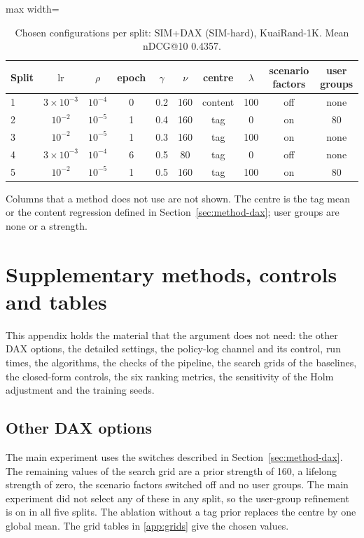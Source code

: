 \documentclass[preprint,12pt,authoryear]{elsarticle}
\begin{document}
\begin{table}[tbp]
\centering
\footnotesize
\caption{Chosen configurations per split: SIM+DAX (SIM-hard), KuaiRand-1K. Mean nDCG@10 0.4357.}
\label{tab:grid17}
\begin{adjustbox}{max width=\linewidth}
\begin{tabular}{lccccccccc}
\toprule
Split & $\mathrm{lr}$ & $\rho$ & epoch & $\gamma$ & $\nu$ & centre & $\lambda$ & scenario factors & user groups \\
\midrule
1 & $3\times10^{-3}$ & $10^{-4}$ & 0 & 0.2 & 160 & content & 100 & off & none \\
2 & $10^{-2}$ & $10^{-5}$ & 1 & 0.4 & 160 & tag & 0 & on & 80 \\
3 & $10^{-2}$ & $10^{-5}$ & 1 & 0.3 & 160 & tag & 100 & on & none \\
4 & $3\times10^{-3}$ & $10^{-4}$ & 6 & 0.5 & 80 & tag & 0 & off & none \\
5 & $10^{-2}$ & $10^{-5}$ & 1 & 0.5 & 160 & tag & 100 & on & 80 \\
\bottomrule
\end{tabular}
\end{adjustbox}
\par\smallskip
\begin{minipage}{\linewidth}\raggedright\footnotesize Columns that a method does not use are not shown. The centre is the tag mean or the content regression defined in Section~\ref{sec:method-dax}; user groups are none or a strength.\end{minipage}
\end{table}

\section{Supplementary methods, controls and tables}
\label{app:supp}

This appendix holds the material that the argument does not need: the other DAX options, the detailed settings, the policy-log channel and its
control, run times, the algorithms, the checks of the pipeline, the search grids of the baselines, the closed-form controls, the six ranking metrics, the sensitivity of the
Holm adjustment and the training seeds.

\subsection{Other DAX options}\label{app:fh}

The main experiment uses the switches described in Section~\ref{sec:method-dax}. The remaining values of the search grid are a prior strength of 160, a
lifelong strength of zero, the scenario factors switched off and no user groups. The main experiment did not select any of these in any split, so the user-group refinement is on in all five splits. The
ablation without a tag prior replaces the centre by one global mean. The grid tables in \ref{app:grids} give the chosen values.
\end{document}
